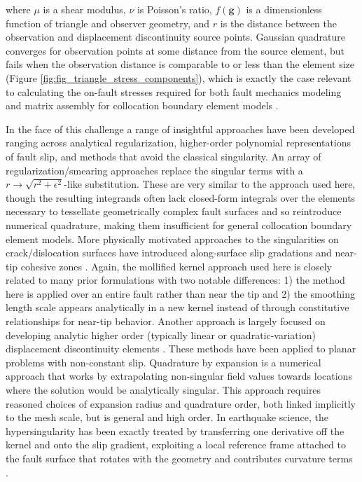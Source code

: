 \documentclass[12pt]{article}
\begin{document}
where $\mu$ is a shear modulus, $\nu$ is Poisson's ratio, $f(\mathbf g)$ is a dimensionless function of triangle and observer geometry, and $r$ is the distance between the observation and displacement discontinuity source points.  Gaussian quadrature converges for observation points at some distance from the source element, but fails when the observation distance is comparable to or less than the element size (Figure \ref{fig:fig_triangle_stress_components}), which is exactly the case relevant to calculating the on-fault stresses required for both fault mechanics modeling and matrix assembly for collocation boundary element models \citep[e.g.,][]{martin1989hypersingular, krishnasamy1992continuity, GuiggianiM.1992AGAf}.

In the face of this challenge a range of insightful approaches have been developed ranging across analytical regularization, higher-order polynomial representations of fault slip, and methods that avoid the classical singularity.  An array of regularization/smearing approaches \citep[e.g.,][]{Eringen1977, GutkinAifantis1999, LazarMaugin2005, CaiArsenlisWeinberger2006, LotheHirth2005} replace the singular terms with a $r \to \sqrt{r^2+\epsilon^2}$-like substitution. These are very similar to the approach used here, though the resulting integrands often lack closed-form integrals over the elements necessary to tessellate geometrically complex fault surfaces and so reintroduce numerical quadrature, making them insufficient for general collocation boundary element models. More physically motivated approaches to the singularities on crack/dislocation surfaces have introduced along-surface slip gradations and near-tip cohesive zones \citep[e.g.,][]{Peierls1940, Nabarro1947, Dugdale1960, Barenblatt1962, Ida1972, Rice1992}. Again, the mollified kernel approach used here is closely related to many prior formulations with two notable differences: 1) the method here is applied over an entire fault rather than near the tip and 2) the smoothing length scale appears analytically in a new kernel instead of through constitutive relationships for near-tip behavior. Another approach is largely focused on developing analytic higher order (typically linear or quadratic-variation) displacement discontinuity elements \citep[e.g.,][]{CrawfordCurran1982, ShouCrouch1995, ShouNapierCrouch1997}. These methods have been applied to planar problems with non-constant slip.  Quadrature by expansion \citep{KlocknerBarnettGreengard2013} is a numerical approach that works by extrapolating non-singular field values towards locations where the solution would be analytically singular. This approach requires reasoned choices of expansion radius and quadrature order, both linked implicitly to the mesh scale, but is general and high order. In earthquake science, the hypersingularity has been exactly treated by transferring one derivative off the kernel and onto the slip gradient, exploiting a local reference frame attached to the fault surface that rotates with the geometry and contributes curvature terms \citep[e.g.,][]{sato2020paradox, RomanetOzawa2022}.
\end{document}
